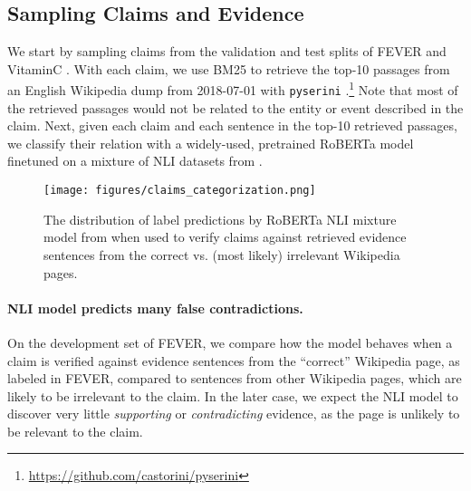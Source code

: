 
\subsection{Sampling Claims and Evidence}
We start by sampling claims from the validation and test splits of FEVER \cite{thorne-etal-2018-fever} and VitaminC \cite{schuster-etal-2021-get}. With each claim, we use BM25 to retrieve the top-10 passages from an English Wikipedia dump from 2018-07-01 with \texttt{pyserini} \cite{Lin_etal_SIGIR2021_Pyserini}  .\footnote{\url{https://github.com/castorini/pyserini}} Note that most of the retrieved passages would not be related to the entity or event described in the claim.  
Next, given each claim and each sentence in the top-10 retrieved passages, 
we classify their relation with a widely-used, pretrained RoBERTa model \cite{liu2019roberta} finetuned on a mixture of NLI datasets from \citet{nie-etal-2020-adversarial}.


\begin{figure}
    \centering
    \texttt{[image: figures/claims\_categorization.png]}
    \caption{The distribution of label predictions by RoBERTa NLI mixture model from  \citet{nie-etal-2020-adversarial} when used to verify claims against retrieved evidence sentences from the correct vs. (most likely) irrelevant Wikipedia pages.}
    \label{fig:fever-dist}
\end{figure}


\paragraph{NLI model predicts many false contradictions.} 
On the development set of FEVER, we compare how the model behaves when a claim is verified against evidence sentences from the ``correct'' Wikipedia page, as labeled in FEVER, compared to sentences from other Wikipedia pages, which are likely to be irrelevant to the claim. In the later case, we expect the NLI model to discover very little \textit{supporting} or \textit{contradicting} evidence, as the page is unlikely to be relevant to the claim. 


